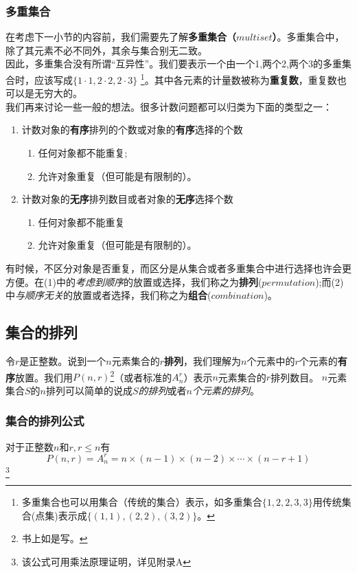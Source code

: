 \documentclass{ctexart}
\begin{document}
    \subsubsection*{多重集合}在考虑下一小节的内容前，我们需要先了解\textbf{多重集合（$multiset$）}。多重集合中，除了其元素不必不同外，其余与集合别无二致。\\
    因此，多重集合没有所谓“互异性”。我们要表示一个由一个1,两个2,两个3的多重集合时，应该写成$\{1\cdot 1, 2 \cdot 2 , 2 \cdot 3\}$
    \footnote{多重集合也可以用集合（传统的集合）表示，如多重集合$\{1,2,2,3,3\}$用传统集合(点集)表示成$\{(1,1),(2,2),(3,2)\}$。}。其中各元素的计量数被称为\textbf{重复数}，重复数也可以是无穷大的。\\
    我们再来讨论一些一般的想法。很多计数问题都可以归类为下面的类型之一：
    \begin{enumerate}
        \item 计数对象的\textbf{有序}排列的个数或对象的\textbf{有序}选择的个数 \begin{enumerate}
            \item 任何对象都不能重复;
            \item 允许对象重复（但可能是有限制的）。
        \end{enumerate}
        \item 计数对象的\textbf{无序}排列数目或者对象的\textbf{无序}选择个数\begin{enumerate}
            \item 任何对象都不能重复
            \item 允许对象重复（但可能是有限制的）。
        \end{enumerate}
    \end{enumerate}
    有时候，不区分对象是否重复，而区分是从集合或者多重集合中进行选择也许会更方便。在(1)中的\textit{考虑到顺序}的放置或选择，我们称之为\textbf{排列}($permutation$);而(2)中\textit{与顺序无关}的放置或者选择，我们称之为\textbf{组合}($combination$)。
    \subsection{集合的排列}
    令$r$是正整数。说到一个$n$元素集合的$r$\textbf{排列}，我们理解为$n$个元素中的$r$个元素的\textbf{有序}放置。我们用$P(n,r)$\footnote{书上如是写。}（或者标准的$A_n^r$）表示$n$元素集合的$r$排列数目。
    $n$元素集合$S$的$n$排列可以简单的说成\textit{$S$的排列}或者\textit{$n$个元素的排列}。
    \subsubsection{集合的排列公式}
    对于正整数$n$和$r,r \leq n$有
    \[P(n,r) = A_n^r = n \times (n -1 ) \times (n-2) \times \cdots \times (n -r +1)\]
    \footnote{该公式可用乘法原理证明，详见附录A}
\end{document}
